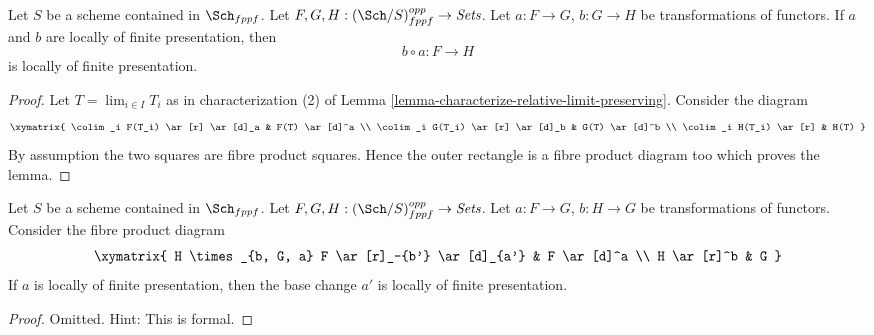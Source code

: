 \begin{lemma}
\label{lemma-composition-locally-finite-presentation}
Let $S$ be a scheme contained in $\Sch_{fppf}$.
Let $F, G, H : (\Sch/S)_{fppf}^{opp} \to \textit{Sets}$.
Let $a : F \to G$, $b : G \to H$ be transformations of functors.
If $a$ and $b$ are locally of finite presentation, then
$$
b \circ a : F \longrightarrow H
$$
is locally of finite presentation.
\end{lemma}

\begin{proof}
Let $T = \lim_{i \in I} T_i$ as in characterization (2) of
Lemma \ref{lemma-characterize-relative-limit-preserving}.
Consider the diagram
$$
\xymatrix{
\colim_i F(T_i) \ar[r] \ar[d]_a & F(T) \ar[d]^a \\
\colim_i G(T_i) \ar[r] \ar[d]_b & G(T) \ar[d]^b \\
\colim_i H(T_i) \ar[r] & H(T)
}
$$
By assumption the two squares are fibre product squares. Hence the
outer rectangle is a fibre product diagram too which proves the lemma.
\end{proof}

\begin{lemma}
\label{lemma-base-change-locally-finite-presentation}
Let $S$ be a scheme contained in $\Sch_{fppf}$.
Let $F, G, H : (\Sch/S)_{fppf}^{opp} \to \textit{Sets}$.
Let $a : F \to G$, $b : H \to G$ be transformations of functors.
Consider the fibre product diagram
$$
\xymatrix{
H \times_{b, G, a} F \ar[r]_-{b'} \ar[d]_{a'} & F \ar[d]^a \\
H \ar[r]^b & G
}
$$
If $a$ is locally of finite presentation, then the base change $a'$ is
locally of finite presentation.
\end{lemma}

\begin{proof}
Omitted. Hint: This is formal.
\end{proof}

